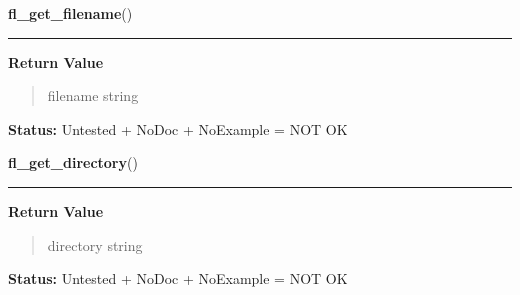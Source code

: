 \hspace{.8\funcindent}\begin{boxedminipage}{\funcwidth}

    \raggedright \textbf{fl\_get\_filename}()

    \vspace{-1.5ex}

    \rule{\textwidth}{0.5\fboxrule}
\setlength{\parskip}{2ex}
\setlength{\parskip}{1ex}
      \textbf{Return Value}
    \vspace{-1ex}

      \begin{quote}
      filename string

      \end{quote}

\textbf{Status:} Untested + NoDoc + NoExample = NOT OK



    \end{boxedminipage}

    \label{xformslib:library:fl_get_directory}

    \vspace{0.5ex}

\hspace{.8\funcindent}\begin{boxedminipage}{\funcwidth}

    \raggedright \textbf{fl\_get\_directory}()

    \vspace{-1.5ex}

    \rule{\textwidth}{0.5\fboxrule}
\setlength{\parskip}{2ex}
\setlength{\parskip}{1ex}
      \textbf{Return Value}
    \vspace{-1ex}

      \begin{quote}
      directory string

      \end{quote}

\textbf{Status:} Untested + NoDoc + NoExample = NOT OK



    \end{boxedminipage}

    \label{xformslib:library:fl_get_pattern}


